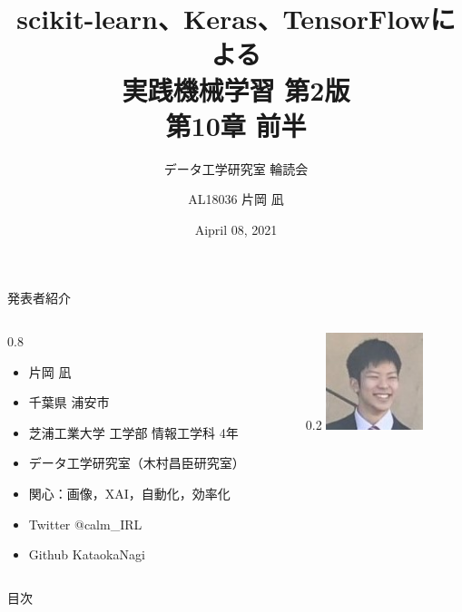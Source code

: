 \documentclass[aspectratio=169, dvipdfmx, 14pt, xcolor={svgnames,dvipsnames}]{beamer}
\title[実践機械学習 輪読会 第10章 前半]{scikit-learn、Keras、TensorFlowによる\\実践機械学習 第2版\\第10章 前半}
\subtitle{データ工学研究室 輪読会}
\author[片岡 凪]{AL18036 片岡 凪}
\institute[データ工学研究室 B4]{芝浦工業大学 工学部 情報工学科 4年}
\date{Aipril 08, 2021}
\newlength{\mytotalwidth}
\newlength{\mycolumnwidth}
\begin{document}

\maketitle


\begin{frame}{\quad 発表者紹介}
  \begin{columns}[totalwidth=\mytotalwidth]
    \begin{column}[t]{0.8\mycolumnwidth}
      \begin{itemize}
        \item 片岡 凪
        \item 千葉県 浦安市
        \item 芝浦工業大学 工学部 情報工学科 4年
        \item データ工学研究室（木村昌臣研究室）
        \item 関心：画像，XAI，自動化，効率化
        \item Twitter @calm\_IRL
        \item Github  KataokaNagi
      \end{itemize}
    \end{column}
    \begin{column}[T]{0.2\mycolumnwidth}
      \centering
      \includegraphics[width=80pt]{img/icon.jpg}
    \end{column}
  \end{columns}
\end{frame}


\begin{frame}{\quad 目次}
  \tableofcontents
\end{frame}

\end{document}
